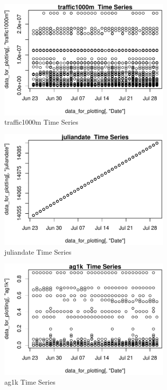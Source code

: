 \begin{figure} 
\centering  
\includegraphics[width=0.77\textwidth]{Code_Outputs/ML_input_report_AllforCaret_cleaned_StepPractice_part_practice_traffic1000mTS.pdf} 
\caption{\label{fig:ML_input_report_AllforCaret_cleaned_StepPractice_part_practicetraffic1000mTS}traffic1000m  Time Series} 
\end{figure} 
 

\begin{figure} 
\centering  
\includegraphics[width=0.77\textwidth]{Code_Outputs/ML_input_report_AllforCaret_cleaned_StepPractice_part_practice_juliandateTS.pdf} 
\caption{\label{fig:ML_input_report_AllforCaret_cleaned_StepPractice_part_practicejuliandateTS}juliandate  Time Series} 
\end{figure} 
 

\begin{figure} 
\centering  
\includegraphics[width=0.77\textwidth]{Code_Outputs/ML_input_report_AllforCaret_cleaned_StepPractice_part_practice_ag1kTS.pdf} 
\caption{\label{fig:ML_input_report_AllforCaret_cleaned_StepPractice_part_practiceag1kTS}ag1k  Time Series} 
\end{figure} 
 

